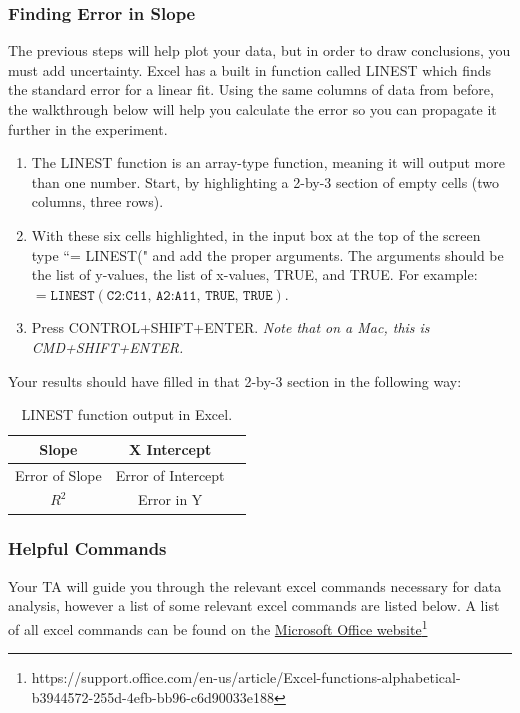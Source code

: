 \subsubsection{Finding Error in Slope}
\label{sec:linest}

The previous steps will help plot your data, but in order to draw conclusions, you must add uncertainty. Excel has a built in function called LINEST which finds the standard error for a linear fit. Using the same columns of data from before, the walkthrough below will help you calculate the error so you can propagate it further in the experiment.

\begin{enumerate}
\item The LINEST function is an array-type function, meaning it will output more than one number. Start, by highlighting a 2-by-3 section of empty cells (two columns, three rows).
\item With these six cells highlighted, in the input box at the top of the screen type ``= LINEST(" and add the proper arguments. The arguments should be the list of y-values, the list of x-values, TRUE, and TRUE.
For example:
$=\texttt{LINEST}(\texttt{C2:C11, A2:A11, TRUE, TRUE})$.

\item Press CONTROL+SHIFT+ENTER. \it{Note that on a Mac, this is CMD+SHIFT+ENTER.}
\end{enumerate}

Your results should have filled in that 2-by-3 section in the following way:
\begin {table}[H]
\begin{center}
\begin{tabular}{ |c | c | c |}
\hline
Slope &X Intercept \\ \hline
Error of Slope &Error of Intercept \\ \hline
$R^2$ &Error in Y \\ \hline
\end{tabular}
\caption{LINEST function output in Excel.}
\end{center}
\end{table}

\subsubsection{Helpful Commands}

Your TA will guide you through the relevant excel commands necessary for data analysis, however a list of some relevant excel commands are listed below. A list of all excel commands can be found on the \href{https://support.office.com/en-us/article/Excel-functions-alphabetical-b3944572-255d-4efb-bb96-c6d90033e188}{Microsoft Office website}\footnote{https://support.office.com/en-us/article/Excel-functions-alphabetical-b3944572-255d-4efb-bb96-c6d90033e188}

